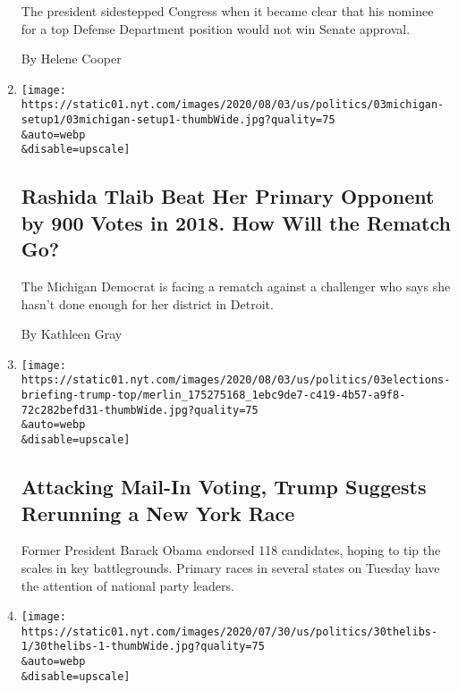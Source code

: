 \begin{enumerate}
  The president sidestepped Congress when it became clear that his
  nominee for a top Defense Department position would not win Senate
  approval.

  By Helene Cooper
\item
  \href{/2020/08/03/us/politics/michigan-primary-rashida-tlaib-brenda-jones.html}{}

  \texttt{[image: https://static01.nyt.com/images/2020/08/03/us/politics/03michigan-setup1/03michigan-setup1-thumbWide.jpg?quality=75\\\&auto=webp\\\&disable=upscale]}

  \hypertarget{rashida-tlaib-beat-her-primary-opponent-by-900-votes-in-2018-how-will-the-rematch-go}{%
  \subsection{Rashida Tlaib Beat Her Primary Opponent by 900 Votes in
  2018. How Will the Rematch
  Go?}\label{rashida-tlaib-beat-her-primary-opponent-by-900-votes-in-2018-how-will-the-rematch-go}}

  The Michigan Democrat is facing a rematch against a challenger who
  says she hasn't done enough for her district in Detroit.

  By Kathleen Gray
\item
  \href{/2020/08/03/us/elections/biden-vs-trump.html}{}

  \texttt{[image: https://static01.nyt.com/images/2020/08/03/us/politics/03elections-briefing-trump-top/merlin\_175275168\_1ebc9de7-c419-4b57-a9f8-72c282befd31-thumbWide.jpg?quality=75\\\&auto=webp\\\&disable=upscale]}

  \hypertarget{attacking-mail-in-voting-trump-suggests-rerunning-a-new-york-race}{%
  \subsection{Attacking Mail-In Voting, Trump Suggests Rerunning a New
  York
  Race}\label{attacking-mail-in-voting-trump-suggests-rerunning-a-new-york-race}}

  Former President Barack Obama endorsed 118 candidates, hoping to tip
  the scales in key battlegrounds. Primary races in several states on
  Tuesday have the attention of national party leaders.
\item
  \href{/2020/08/03/us/politics/the-federalist-trump-liberals.html}{}

  \texttt{[image: https://static01.nyt.com/images/2020/07/30/us/politics/30thelibs-1/30thelibs-1-thumbWide.jpg?quality=75\\\&auto=webp\\\&disable=upscale]}


\end{enumerate}
